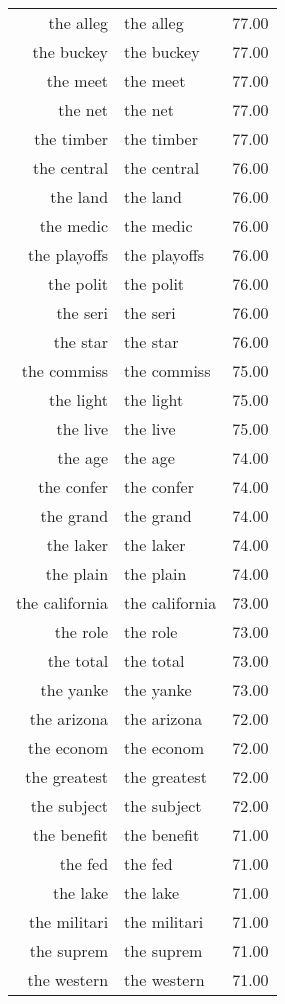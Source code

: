 \begin{table}[ht]
\begin{tabular}{rlr}
  the alleg & the alleg & 77.00 \\ 
  the buckey & the buckey & 77.00 \\ 
  the meet & the meet & 77.00 \\ 
  the net & the net & 77.00 \\ 
  the timber & the timber & 77.00 \\ 
  the central & the central & 76.00 \\ 
  the land & the land & 76.00 \\ 
  the medic & the medic & 76.00 \\ 
  the playoffs & the playoffs & 76.00 \\ 
  the polit & the polit & 76.00 \\ 
  the seri & the seri & 76.00 \\ 
  the star & the star & 76.00 \\ 
  the commiss & the commiss & 75.00 \\ 
  the light & the light & 75.00 \\ 
  the live & the live & 75.00 \\ 
  the age & the age & 74.00 \\ 
  the confer & the confer & 74.00 \\ 
  the grand & the grand & 74.00 \\ 
  the laker & the laker & 74.00 \\ 
  the plain & the plain & 74.00 \\ 
  the california & the california & 73.00 \\ 
  the role & the role & 73.00 \\ 
  the total & the total & 73.00 \\ 
  the yanke & the yanke & 73.00 \\ 
  the arizona & the arizona & 72.00 \\ 
  the econom & the econom & 72.00 \\ 
  the greatest & the greatest & 72.00 \\ 
  the subject & the subject & 72.00 \\ 
  the benefit & the benefit & 71.00 \\ 
  the fed & the fed & 71.00 \\ 
  the lake & the lake & 71.00 \\ 
  the militari & the militari & 71.00 \\ 
  the suprem & the suprem & 71.00 \\ 
  the western & the western & 71.00 \\ 

\end{tabular}
\end{table}
